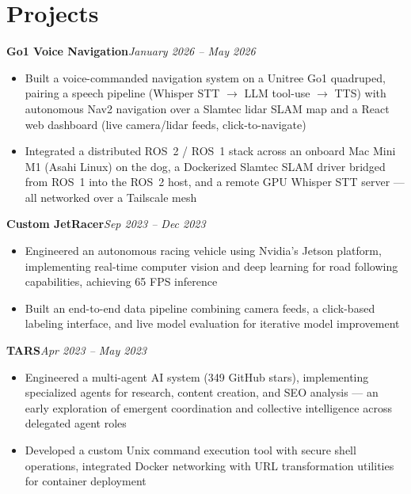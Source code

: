 \documentclass[11pt, letterpaper]{article}
\newcommand{\entryhead}[2]{%
    \noindent\textbf{#1}\hfill\textit{#2}\\[-5pt]%
}
\begin{document}
\section{Projects}

\entryhead{Go1 Voice Navigation}{January 2026 -- May 2026}
\begin{itemize}
    \item Built a voice-commanded navigation system on a Unitree Go1 quadruped, pairing a speech pipeline (Whisper STT $\to$ LLM tool-use $\to$ TTS) with autonomous Nav2 navigation over a Slamtec lidar SLAM map and a React web dashboard (live camera/lidar feeds, click-to-navigate)
    \item Integrated a distributed ROS~2 / ROS~1 stack across an onboard Mac Mini M1 (Asahi Linux) on the dog, a Dockerized Slamtec SLAM driver bridged from ROS~1 into the ROS~2 host, and a remote GPU Whisper STT server --- all networked over a Tailscale mesh
\end{itemize}

\vspace{4pt}

\entryhead{Custom JetRacer}{Sep 2023 -- Dec 2023}
\begin{itemize}
    \item Engineered an autonomous racing vehicle using Nvidia's Jetson platform, implementing real-time computer vision and deep learning for road following capabilities, achieving 65 FPS inference
    \item Built an end-to-end data pipeline combining camera feeds, a click-based labeling interface, and live model evaluation for iterative model improvement
\end{itemize}

\vspace{4pt}

\entryhead{TARS}{Apr 2023 -- May 2023}
\begin{itemize}
    \item Engineered a multi-agent AI system (349 GitHub stars), implementing specialized agents for research, content creation, and SEO analysis --- an early exploration of emergent coordination and collective intelligence across delegated agent roles
    \item Developed a custom Unix command execution tool with secure shell operations, integrated Docker networking with URL transformation utilities for container deployment
\end{itemize}
\end{document}
